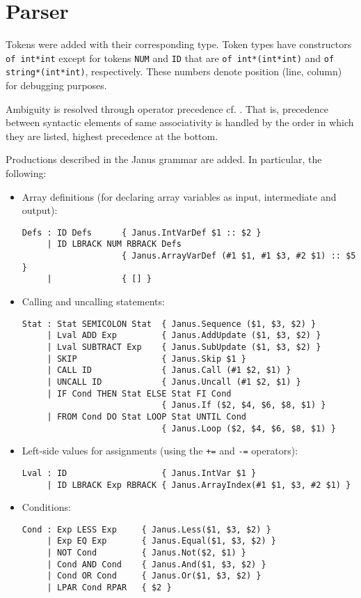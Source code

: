 \section{Parser}
Tokens were added with their corresponding type. Token types have constructors
\verb+of int*int+ except for tokens \verb+NUM+ and \verb+ID+ that are
\verb+of int*(int*int)+ and \verb+of string*(int*int)+, respectively. These
numbers denote position (line, column) for debugging purposes.

Ambiguity is resolved through operator precedence cf. \cite[ch. 18.2.2, p.
33]{mosowner}.  That is, precedence between syntactic elements of same
associativity is handled by the order in which they are listed, highest
precedence at the bottom.

Productions described in the Janus grammar are added. In particular, the
following:

\begin{itemize}
  \item Array definitions (for declaring array variables as input, intermediate
        and output):
\begin{verbatim}
Defs : ID Defs      { Janus.IntVarDef $1 :: $2 }
     | ID LBRACK NUM RBRACK Defs
                    { Janus.ArrayVarDef (#1 $1, #1 $3, #2 $1) :: $5 }
     |              { [] }
\end{verbatim}
  \item Calling and uncalling statements:
\begin{verbatim}
Stat : Stat SEMICOLON Stat  { Janus.Sequence ($1, $3, $2) }
     | Lval ADD Exp         { Janus.AddUpdate ($1, $3, $2) }
     | Lval SUBTRACT Exp    { Janus.SubUpdate ($1, $3, $2) }
     | SKIP                 { Janus.Skip $1 }
     | CALL ID              { Janus.Call (#1 $2, $1) }
     | UNCALL ID            { Janus.Uncall (#1 $2, $1) }
     | IF Cond THEN Stat ELSE Stat FI Cond
                            { Janus.If ($2, $4, $6, $8, $1) }
     | FROM Cond DO Stat LOOP Stat UNTIL Cond
                            { Janus.Loop ($2, $4, $6, $8, $1) }
\end{verbatim}
  \item Left-side values for assignments (using the \verb!+=! and \verb!-=!
        operators):
\begin{verbatim}
Lval : ID                   { Janus.IntVar $1 }
     | ID LBRACK Exp RBRACK { Janus.ArrayIndex(#1 $1, $3, #2 $1) }
\end{verbatim}
  \item Conditions:
\begin{verbatim}
Cond : Exp LESS Exp     { Janus.Less($1, $3, $2) }
     | Exp EQ Exp       { Janus.Equal($1, $3, $2) }
     | NOT Cond         { Janus.Not($2, $1) }
     | Cond AND Cond    { Janus.And($1, $3, $2) }
     | Cond OR Cond     { Janus.Or($1, $3, $2) }
     | LPAR Cond RPAR   { $2 }
\end{verbatim}
\end{itemize}

